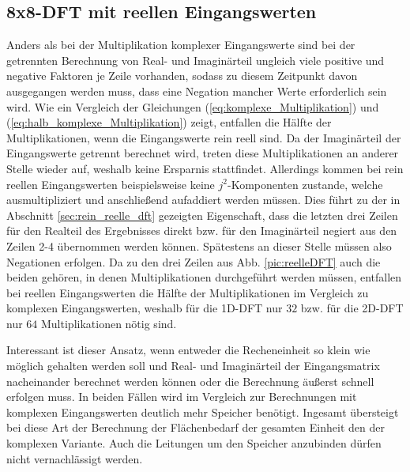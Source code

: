 \subsection{8x8-DFT mit reellen Eingangswerten}\label{sec:RelleEingangswerte}
Anders als bei der Multiplikation komplexer Eingangswerte sind bei der getrennten Berechnung von Real- und Imaginärteil ungleich viele positive 
und negative Faktoren je Zeile vorhanden, sodass zu diesem Zeitpunkt davon ausgegangen werden muss, dass eine Negation mancher Werte erforderlich sein wird. 
Wie ein Vergleich der Gleichungen (\ref{eq:komplexe_Multiplikation}) und (\ref{eq:halb_komplexe_Multiplikation}) zeigt, entfallen die Hälfte der Multiplikationen, wenn die
Eingangswerte rein reell sind. Da der Imaginärteil der Eingangswerte getrennt berechnet wird, treten diese Multiplikationen an anderer Stelle wieder auf, weshalb keine Ersparnis stattfindet.
Allerdings kommen bei rein reellen Eingangswerten beispielsweise keine $j^2$-Komponenten zustande, welche ausmultipliziert und anschließend aufaddiert werden müssen. 
Dies führt zu der in Abschnitt \ref{sec:rein_reelle_dft} gezeigten Eigenschaft, dass die letzten drei Zeilen für den Realteil des Ergebnisses direkt bzw. für den Imaginärteil 
negiert aus den Zeilen 2-4 übernommen werden können. Spätestens an dieser Stelle müssen also Negationen erfolgen.
Da zu den drei Zeilen aus Abb. \ref{pic:reelleDFT} auch die beiden gehören, in denen Multiplikationen durchgeführt werden müssen, entfallen bei reellen Eingangswerten die 
Hälfte der Multiplikationen im Vergleich zu komplexen Eingangswerten, weshalb für die 1D-DFT nur $32$ bzw. für die 2D-DFT nur $64$ Multiplikationen nötig sind.

Interessant ist dieser Ansatz, wenn entweder die Recheneinheit so klein wie möglich gehalten werden soll und Real- und Imaginärteil der Eingangsmatrix nacheinander
berechnet werden können oder die Berechnung äußerst schnell erfolgen muss. In beiden Fällen wird im Vergleich zur Berechnungen mit komplexen Eingangswerten deutlich mehr
Speicher benötigt.
Ingesamt übersteigt bei diese Art der Berechnung der Flächenbedarf der gesamten Einheit den der komplexen Variante. Auch die Leitungen um den Speicher anzubinden dürfen 
nicht vernachlässigt werden.



